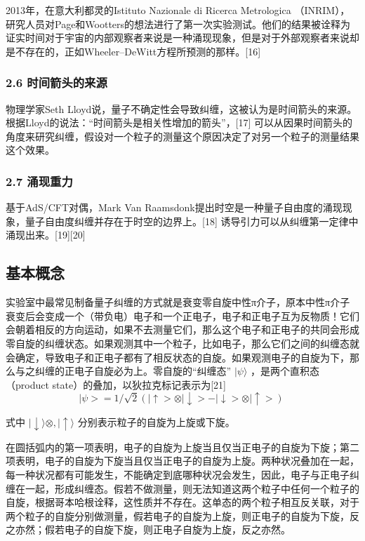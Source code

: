 2013年，在意大利都灵的Istituto Nazionale di Ricerca Metrologica （INRIM），研究人员对Page和Wootters的想法进行了第一次实验测试。他们的结果被诠释为证实时间对于宇宙的内部观察者来说是一种涌现现象，但是对于外部观察者来说却是不存在的，正如Wheeler–DeWitt方程所预测的那样。[16]

\subsubsection{2.6 时间箭头的来源}
物理学家Seth Lloyd说，量子不确定性会导致纠缠，这被认为是时间箭头的来源。根据Lloyd的说法：“时间箭头是相关性增加的箭头”，[17] 可以从因果时间箭头的角度来研究纠缠，假设对一个粒子的测量这个原因决定了对另一个粒子的测量结果这个效果。

\subsubsection{2.7 涌现重力}
基于AdS/CFT对偶，Mark Van Raamsdonk提出时空是一种量子自由度的涌现现象，量子自由度纠缠并存在于时空的边界上。[18] 诱导引力可以从纠缠第一定律中涌现出来。[19][20]

\subsection{基本概念}
实验室中最常见制备量子纠缠的方式就是衰变零自旋中性π介子，原本中性π介子衰变后会变成一个（带负电）电子和一个正电子，电子和正电子互为反物质！它们会朝着相反的方向运动，如果不去测量它们，那么这个电子和正电子的共同会形成零自旋的纠缠状态。如果观测其中一个粒子，比如电子，那么它们之间的纠缠态就会确定，导致电子和正电子都有了相反状态的自旋。如果观测电子的自旋为下，那么与之纠缠的正电子自旋必为上。零自旋的“纠缠态” $|\psi \rangle$ ，是两个直积态（product state）的叠加，以狄拉克标记表示为[21]
$$|\psi > = {1}/{\sqrt{2}} \left( |\uparrow >\otimes |\downarrow > - |\downarrow > \otimes |\uparrow  > \right)~$$

式中 $|\downarrow \rangle \otimes,|\uparrow \rangle$ 分别表示粒子的自旋为上旋或下旋。

在圆括弧内的第一项表明，电子的自旋为上旋当且仅当正电子的自旋为下旋；第二项表明，电子的自旋为下旋当且仅当正电子的自旋为上旋。两种状况叠加在一起，每一种状况都有可能发生，不能确定到底哪种状况会发生，因此，电子与正电子纠缠在一起，形成纠缠态。假若不做测量，则无法知道这两个粒子中任何一个粒子的自旋，根据哥本哈根诠释，这性质并不存在。这单态的两个粒子相互反关联，对于两个粒子的自旋分别做测量，假若电子的自旋为上旋，则正电子的自旋为下旋，反之亦然；假若电子的自旋下旋，则正电子自旋为上旋，反之亦然。

